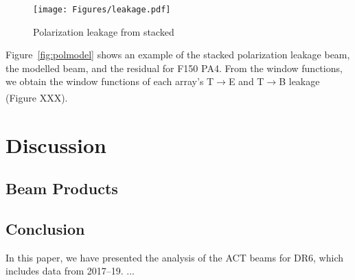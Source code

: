 \begin{figure}
    \centering
    \texttt{[image: Figures/leakage.pdf]}
    \caption{Polarization leakage from stacked}
    \label{fig:leakage}
\end{figure}

Figure~\ref{fig:polmodel} shows an example of the stacked polarization leakage beam, the modelled beam, and the residual for F150 PA4.  From the window functions, we obtain the window functions of each array's T$\xrightarrow[]{}$E and T$\xrightarrow[]{}$B leakage (Figure XXX).


\section{Discussion}
\label{sec:act_disc}

\subsection{Beam Products}
\label{subsec:prods}

\subsection{Conclusion}
\label{subsec:concl}
In this paper, we have presented the analysis of the ACT beams for DR6, which includes data from 2017--19. ...